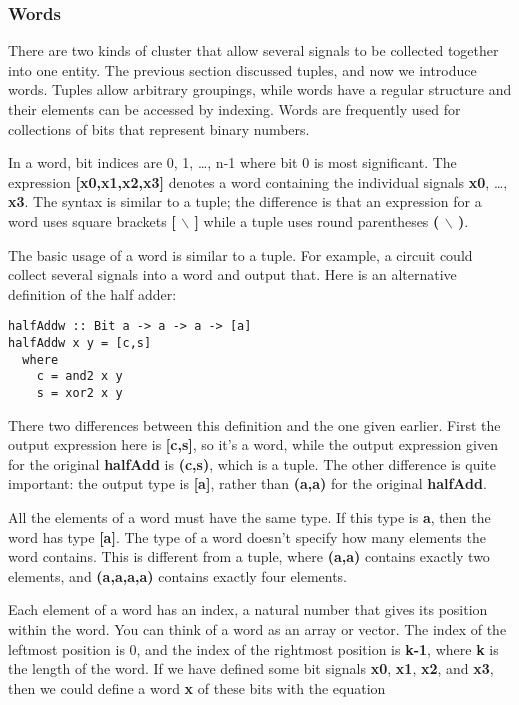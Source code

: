 \documentclass[11pt]{article}
\begin{document}
\subsubsection{Words}
\label{sec:org1de6cfd}

There are two kinds of cluster that allow several signals to be
collected together into one entity.  The previous section discussed
tuples, and now we introduce words.  Tuples allow arbitrary groupings,
while words have a regular structure and their elements can be
accessed by indexing.  Words are frequently used for collections of
bits that represent binary numbers.


In a word, bit indices are 0, 1, \ldots{}, n-1 where bit 0 is most
significant.  The expression \textbf{[x0,x1,x2,x3]} denotes a word containing
the individual signals \textbf{x0}, \ldots{}, \textbf{x3}.  The syntax is similar to a
tuple; the difference is that an expression for a word uses square
brackets \textbf{[ $\backslash$ ]} while a tuple uses round parentheses \textbf{( $\backslash$ )}.

The basic usage of a word is similar to a tuple.  For example, a
circuit could collect several signals into a word and output that.
Here is an alternative definition of the half adder:


\begin{verbatim}
halfAddw :: Bit a -> a -> a -> [a]
halfAddw x y = [c,s]
  where
    c = and2 x y
    s = xor2 x y
\end{verbatim}


There two differences between this definition and the one given
earlier.  First the output expression here is \textbf{[c,s]}, so it's a word,
while the output expression given for the original \textbf{halfAdd} is
\textbf{(c,s)}, which is a tuple.  The other difference is quite important:
the output type is \textbf{[a]}, rather than \textbf{(a,a)} for the original
\textbf{halfAdd}.

All the elements of a word must have the same type.  If this type is
\textbf{a}, then the word has type \textbf{[a]}.  The type of a word doesn't specify
how many elements the word contains.  This is different from a tuple,
where \textbf{(a,a)} contains exactly two elements, and \textbf{(a,a,a,a)} contains
exactly four elements.

Each element of a word has an index, a natural number that gives its
position within the word.  You can think of a word as an array or
vector.  The index of the leftmost position is 0, and the index of the
rightmost position is \textbf{k-1}, where \textbf{k} is the length of the word.
If we have defined some bit signals \textbf{x0}, \textbf{x1}, \textbf{x2}, and \textbf{x3}, then
we could define a word \textbf{x} of these bits with the equation
\end{document}
